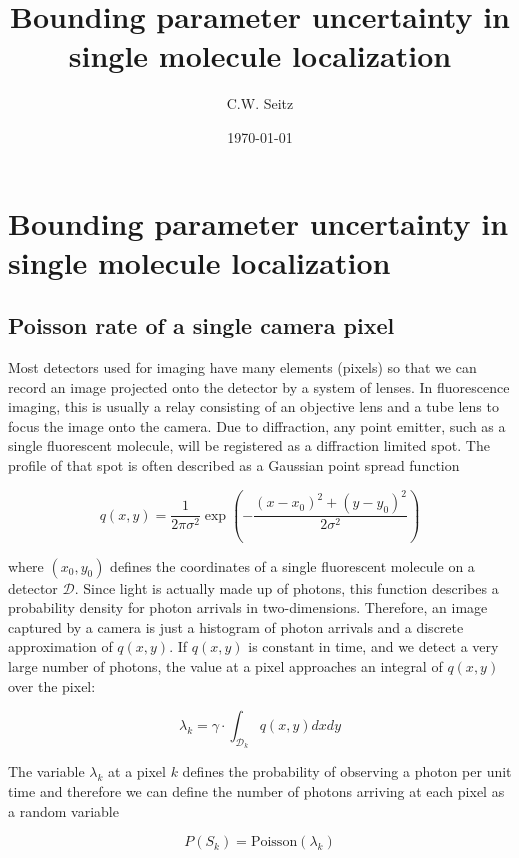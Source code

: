 \documentclass{article}
\title{Bounding parameter uncertainty in single molecule localization}
\author{C.W. Seitz}
\date{\today}
\begin{document}
\maketitle


\section{Bounding parameter uncertainty in single molecule localization}

\subsection{Poisson rate of a single camera pixel}

Most detectors used for imaging have many elements (pixels) so that we can record an image projected onto the detector by a system of lenses. In fluorescence imaging, this is usually a relay consisting of an objective lens and a tube lens to focus the image onto the camera. Due to diffraction, any point emitter, such as a single fluorescent molecule, will be registered as a diffraction limited spot. The profile of that spot is often described as a Gaussian point spread function

\begin{equation*}
q(x,y) = \frac{1}{2\pi\sigma^{2}}\exp\left(-\frac{(x-x_{0})^{2}+(y-y_{0})^{2}}{2\sigma^{2}}\right)
\end{equation*}

where $(x_0,y_0)$ defines the coordinates of a single fluorescent molecule on a detector $\mathcal{D}$. Since light is actually made up of photons, this function describes a probability density for photon arrivals in two-dimensions. Therefore, an image captured by a camera is just a histogram of photon arrivals and a discrete approximation of $q(x,y)$. If $q(x,y)$ is constant in time, and we detect a very large number of photons, the value at a pixel approaches an integral of $q(x,y)$ over the pixel:

\begin{equation*}
\lambda_{k} = \gamma\cdot\int_{\mathcal{D}_{k}} q(x,y)dxdy
\end{equation*}

The variable $\lambda_{k}$ at a pixel $k$ defines the probability of observing a photon per unit time and therefore we can define the number of photons arriving at each pixel as a random variable

\begin{equation*}
P(S_{k}) = \mathrm{Poisson}(\lambda_{k})
\end{equation*}
\end{document}
